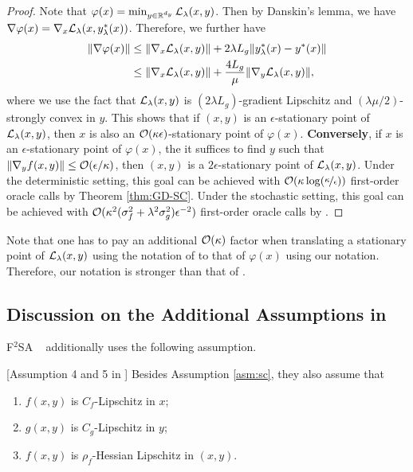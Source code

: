 \begin{proof}
Note that $\varphi(x) = \min_{y \in {\mathbb{R}}^{d_y}} {\mathcal{L}}_{\lambda}(x,y)$. Then by Danskin's lemma, we have $\nabla \varphi(x) = \nabla_x {\mathcal{L}}_{\lambda}(x,y_{\lambda}^*(x))$. Therefore, we further have
\begin{align*}
    \Vert \nabla \varphi(x) \Vert &\le \Vert \nabla_x {\mathcal{L}}_{\lambda}(x,y) \Vert + 2 \lambda L_g \Vert y_{\lambda}^*(x) - y^*(x) \Vert \\
    &\le \Vert \nabla_x {\mathcal{L}}_{\lambda}(x,y) \Vert + \frac{4 L_g}{\mu} \Vert \nabla_y {\mathcal{L}}_{\lambda}(x,y) \Vert,
\end{align*}
where we use the fact that ${\mathcal{L}}_{\lambda}(x,y)$ is $(2\lambda L_g)$-gradient Lipschitz and $(\lambda \mu /2)$-strongly convex in $y$. This shows that if $(x,y)$ is an $\epsilon$-stationary point of ${\mathcal{L}}_{\lambda}(x,y)$, then $x$ is also an ${\mathcal{O}}(\kappa \epsilon)$-stationary point of $\varphi(x)$.
\textbf{Conversely}, if $x$ is an $\epsilon$-stationary point of $\varphi(x)$, the it suffices to find $y$ such that $ \Vert \nabla_y f(x,y) \Vert \le {\mathcal{O}}(\epsilon/\kappa)$, then $(x,y)$ is a $2\epsilon$-stationary point of ${\mathcal{L}}_{\lambda}(x,y)$. Under the deterministic setting, this goal can be achieved with ${\mathcal{O}}(\kappa \log(\nicefrac{\kappa}{\epsilon}))$ first-order oracle calls by Theorem \ref{thm:GD-SC}. Under the stochastic setting, this goal can be achieved with ${\mathcal{O}}(\kappa^2 (\sigma_f^2 + \lambda^2 \sigma_g^2)  \epsilon^{-2} )$ first-order oracle calls by \citep[Theorem 3]{allen2018make}.
\end{proof}

Note that one has to pay an additional ${\mathcal{O}}(\kappa)$ factor when translating a stationary point of ${\mathcal{L}}_{\lambda}(x,y)$ using the notation of \citet{shen2023penalty} to that of $\varphi(x)$ using our notation. Therefore, our notation is stronger than that of \citet{shen2023penalty}.

\subsection{Discussion on the Additional Assumptions in \citep{kwon2023fully}}  \label{apx:diss-kwon}
F${}^2$SA ~\citep[Algorithm 1]{kwon2023fully} additionally uses the following assumption.

\begin{asm} \label{asm:F2SA}[Assumption 4 and 5 in \citet{kwon2023fully}]
Besides Assumption \ref{asm:sc}, they also assume that
\begin{enumerate}
    \item $f(x,y)$ is $C_f$-Lipschitz in $x$;
    \item $g(x,y)$ is $C_g$-Lipschitz in $y$;
    \item $f(x,y)$ is $\rho_f$-Hessian Lipschitz in $(x,y)$.
\end{enumerate}
\end{asm}

